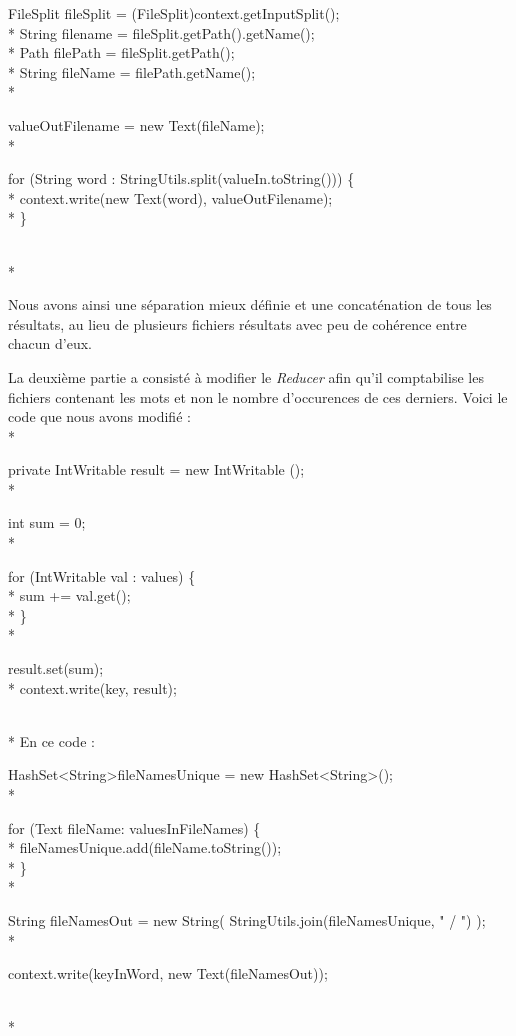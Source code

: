 \documentclass{article}
\begin{document}
\begin{tcolorbox}
FileSplit fileSplit = (FileSplit)context.getInputSplit(); \\*
String filename = fileSplit.getPath().getName(); \\*
Path filePath = fileSplit.getPath(); \\*
String fileName = filePath.getName(); \\*

valueOutFilename = new Text(fileName); \\*

for (String word : StringUtils.split(valueIn.toString())) \{ \\*
\tabto{1cm} context.write(new Text(word), valueOutFilename); \\*
\}
\end{tcolorbox}
~ \\*

Nous avons ainsi une s\'{e}paration mieux d\'{e}finie et une concat\'{e}nation de tous les r\'{e}sultats, au lieu de plusieurs fichiers r\'{e}sultats avec peu de coh\'{e}rence entre chacun d'eux.

La deuxi\`{e}me partie a consist\'{e} \`{a} modifier le \textit{Reducer} afin qu'il comptabilise les fichiers contenant les mots et non le nombre d'occurences de ces derniers. Voici le code que nous avons modifi\'{e} : \\*

\begin{tcolorbox}
private IntWritable result = new IntWritable (); \\*
	
int sum = 0; \\*

for (IntWritable val : values) \{ \\*
\tabto{1cm} sum += val.get(); \\*
\} \\*

result.set(sum); \\*
context.write(key, result);
\end{tcolorbox}
~ \\*
En ce code :

\begin{tcolorbox}
HashSet\textless String\textgreater  fileNamesUnique = new HashSet\textless String\textgreater (); \\*

for (Text fileName: valuesInFileNames) \{ \\*
\tabto{1cm} fileNamesUnique.add(fileName.toString()); \\*
\} \\*

String fileNamesOut = new String( StringUtils.join(fileNamesUnique, " / ") ); \\*

context.write(keyInWord, new Text(fileNamesOut));
\end{tcolorbox}
~ \\*
\end{document}
